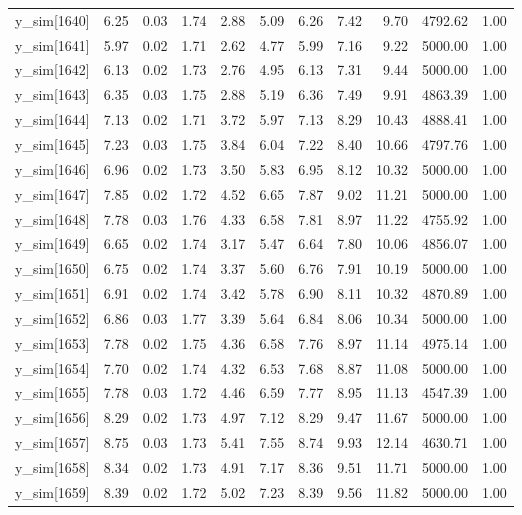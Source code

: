 \begin{table}[ht]
\begin{tabular}{rrrrrrrrrrr}
  y\_sim[1640] & 6.25 & 0.03 & 1.74 & 2.88 & 5.09 & 6.26 & 7.42 & 9.70 & 4792.62 & 1.00 \\ 
  y\_sim[1641] & 5.97 & 0.02 & 1.71 & 2.62 & 4.77 & 5.99 & 7.16 & 9.22 & 5000.00 & 1.00 \\ 
  y\_sim[1642] & 6.13 & 0.02 & 1.73 & 2.76 & 4.95 & 6.13 & 7.31 & 9.44 & 5000.00 & 1.00 \\ 
  y\_sim[1643] & 6.35 & 0.03 & 1.75 & 2.88 & 5.19 & 6.36 & 7.49 & 9.91 & 4863.39 & 1.00 \\ 
  y\_sim[1644] & 7.13 & 0.02 & 1.71 & 3.72 & 5.97 & 7.13 & 8.29 & 10.43 & 4888.41 & 1.00 \\ 
  y\_sim[1645] & 7.23 & 0.03 & 1.75 & 3.84 & 6.04 & 7.22 & 8.40 & 10.66 & 4797.76 & 1.00 \\ 
  y\_sim[1646] & 6.96 & 0.02 & 1.73 & 3.50 & 5.83 & 6.95 & 8.12 & 10.32 & 5000.00 & 1.00 \\ 
  y\_sim[1647] & 7.85 & 0.02 & 1.72 & 4.52 & 6.65 & 7.87 & 9.02 & 11.21 & 5000.00 & 1.00 \\ 
  y\_sim[1648] & 7.78 & 0.03 & 1.76 & 4.33 & 6.58 & 7.81 & 8.97 & 11.22 & 4755.92 & 1.00 \\ 
  y\_sim[1649] & 6.65 & 0.02 & 1.74 & 3.17 & 5.47 & 6.64 & 7.80 & 10.06 & 4856.07 & 1.00 \\ 
  y\_sim[1650] & 6.75 & 0.02 & 1.74 & 3.37 & 5.60 & 6.76 & 7.91 & 10.19 & 5000.00 & 1.00 \\ 
  y\_sim[1651] & 6.91 & 0.02 & 1.74 & 3.42 & 5.78 & 6.90 & 8.11 & 10.32 & 4870.89 & 1.00 \\ 
  y\_sim[1652] & 6.86 & 0.03 & 1.77 & 3.39 & 5.64 & 6.84 & 8.06 & 10.34 & 5000.00 & 1.00 \\ 
  y\_sim[1653] & 7.78 & 0.02 & 1.75 & 4.36 & 6.58 & 7.76 & 8.97 & 11.14 & 4975.14 & 1.00 \\ 
  y\_sim[1654] & 7.70 & 0.02 & 1.74 & 4.32 & 6.53 & 7.68 & 8.87 & 11.08 & 5000.00 & 1.00 \\ 
  y\_sim[1655] & 7.78 & 0.03 & 1.72 & 4.46 & 6.59 & 7.77 & 8.95 & 11.13 & 4547.39 & 1.00 \\ 
  y\_sim[1656] & 8.29 & 0.02 & 1.73 & 4.97 & 7.12 & 8.29 & 9.47 & 11.67 & 5000.00 & 1.00 \\ 
  y\_sim[1657] & 8.75 & 0.03 & 1.73 & 5.41 & 7.55 & 8.74 & 9.93 & 12.14 & 4630.71 & 1.00 \\ 
  y\_sim[1658] & 8.34 & 0.02 & 1.73 & 4.91 & 7.17 & 8.36 & 9.51 & 11.71 & 5000.00 & 1.00 \\ 
  y\_sim[1659] & 8.39 & 0.02 & 1.72 & 5.02 & 7.23 & 8.39 & 9.56 & 11.82 & 5000.00 & 1.00 \\ 

\end{tabular}
\end{table}
